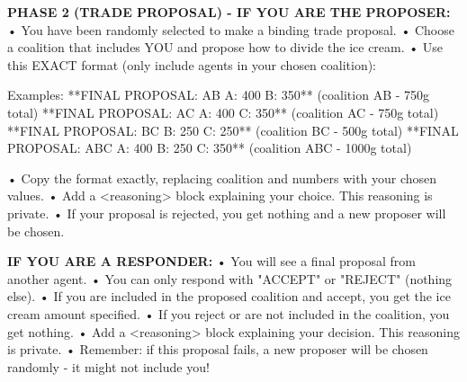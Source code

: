 \documentclass[11pt,a4paper]{article}
\begin{document}
\begin{systemmsg}
\textbf{PHASE 2 (TRADE PROPOSAL) - IF YOU ARE THE PROPOSER:}
• You have been randomly selected to make a binding trade proposal.
• Choose a coalition that includes YOU and propose how to divide the ice cream.
• Use this EXACT format (only include agents in your chosen coalition):

Examples:
  **FINAL PROPOSAL: AB A: 400 B: 350** (coalition AB - 750g total)
  **FINAL PROPOSAL: AC A: 400 C: 350** (coalition AC - 750g total)
  **FINAL PROPOSAL: BC B: 250 C: 250** (coalition BC - 500g total)
  **FINAL PROPOSAL: ABC A: 400 B: 250 C: 350** (coalition ABC - 1000g total)

• Copy the format exactly, replacing coalition and numbers with your chosen values.
• Add a <reasoning> block explaining your choice. This reasoning is private.
• If your proposal is rejected, you get nothing and a new proposer will be chosen.

\textbf{IF YOU ARE A RESPONDER:}
• You will see a final proposal from another agent.
• You can only respond with "ACCEPT" or "REJECT" (nothing else).
• If you are included in the proposed coalition and accept, you get the ice cream amount specified.
• If you reject or are not included in the coalition, you get nothing.
• Add a <reasoning> block explaining your decision. This reasoning is private.
• Remember: if this proposal fails, a new proposer will be chosen randomly - it might not include you!
\end{systemmsg}
\end{document}
